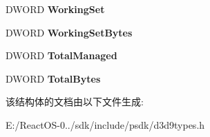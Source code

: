 \begin{DoxyCompactItemize}
D\+W\+O\+RD {\bfseries Working\+Set}
\item 
\mbox{\label{struct_d3_d_r_e_s_o_u_r_c_e_s_t_a_t_s_aad2ecebfd94d1b9f467abbc153abf4d9}} 
D\+W\+O\+RD {\bfseries Working\+Set\+Bytes}
\item 
\mbox{\label{struct_d3_d_r_e_s_o_u_r_c_e_s_t_a_t_s_a801dff4643f80d8d3f0ec9be478cb3b5}} 
D\+W\+O\+RD {\bfseries Total\+Managed}
\item 
\mbox{\label{struct_d3_d_r_e_s_o_u_r_c_e_s_t_a_t_s_a6fd562433ca1bb5d2b4dd13f7866ede6}} 
D\+W\+O\+RD {\bfseries Total\+Bytes}
\end{DoxyCompactItemize}


该结构体的文档由以下文件生成\+:\begin{DoxyCompactItemize}
\item 
E\+:/\+React\+O\+S-\/0../sdk/include/psdk/d3d9types.\+h\end{DoxyCompactItemize}
